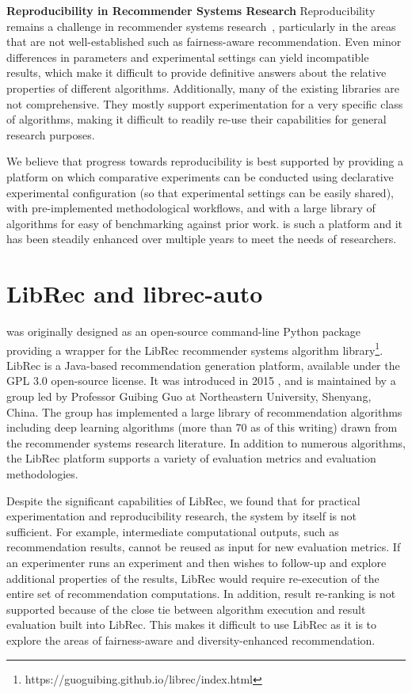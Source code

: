 \textbf{Reproducibility in Recommender Systems Research}
Reproducibility remains a challenge in recommender systems research~\cite{said2014comparative,beel2016towards,sun2020we}, particularly in the areas that are not well-established such as fairness-aware recommendation.
Even minor differences in parameters and experimental settings can yield incompatible results, which make it difficult to provide definitive answers about the relative properties of different algorithms. Additionally, many of the existing libraries are not comprehensive. They mostly support experimentation for a very specific class of algorithms, making it difficult to readily re-use their capabilities for general research purposes. 

We believe that progress towards reproducibility is best supported by providing a platform on which comparative experiments can be conducted using declarative experimental configuration (so that experimental settings can be easily shared), with pre-implemented methodological workflows, and with a large library of algorithms for easy of benchmarking against prior work. \libauto{} is such a platform and it has been steadily enhanced over multiple years to meet the needs of researchers.


\section{LibRec and librec-auto}
\label{sec:libauto}

\libauto{} was originally designed as an open-source command-line Python package providing a wrapper for the LibRec recommender systems algorithm library\footnote{https://guoguibing.github.io/librec/index.html}. LibRec is a Java-based recommendation generation platform, available under the GPL 3.0 open-source license. It was introduced in 2015 \cite{guo2015librec}, and is maintained by a group led by Professor Guibing Guo at Northeastern University, Shenyang, China. The group has implemented a large library of recommendation algorithms including deep learning algorithms (more than 70 as of this writing) drawn from the recommender systems research literature. In addition to numerous algorithms, the LibRec platform supports a variety of evaluation metrics and evaluation methodologies.

Despite the significant capabilities of LibRec, we found that for practical experimentation and reproducibility research, the system by itself is not sufficient. For example, intermediate computational outputs, such as recommendation results, cannot be reused as input for new evaluation metrics. If an experimenter runs an experiment and then wishes to follow-up and explore additional properties of the results, LibRec would require re-execution of the entire set of recommendation computations. In addition, result re-ranking is not supported because of the close tie between algorithm execution and result evaluation built into LibRec. This makes it difficult to use LibRec as it is to explore the areas of fairness-aware and diversity-enhanced recommendation.

